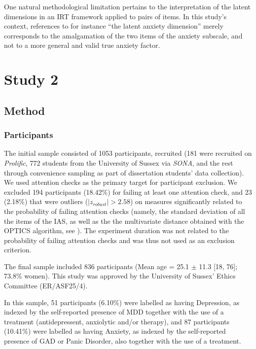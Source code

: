 \documentclass[
  jou,
  floatsintext,
  longtable,
  nolmodern,
  notxfonts,
  notimes,
  colorlinks=true,linkcolor=blue,citecolor=blue,urlcolor=blue]{apa7}
\begin{document}
One natural methodological limitation pertains to the interpretation of
the latent dimensions in an IRT framework applied to pairs of items. In
this study's context, references to for instance ``the latent anxiety
dimension'' merely corresponds to the amalgamation of the two items of
the anxiety subscale, and not to a more general and valid true anxiety
factor.

\section{Study 2}\label{study-2}

\subsection{Method}\label{method-1}

\subsubsection{Participants}\label{participants-1}

The initial sample consisted of 1053 participants, recruited (181 were
recruited on \emph{Prolific}, 772 students from the University of Sussex
via \emph{SONA}, and the rest through convenience sampling as part of
dissertation students' data collection). We used attention checks as the
primary target for participant exclusion. We excluded 194 participants
(18.42\%) for failing at least one attention check, and 23 (2.18\%) that
were outliers (\(|z_{robust}| > 2.58\)) on measures significantly
related to the probability of failing attention checks (namely, the
standard deviation of all the items of the IAS, as well as the the
multivariate distance obtained with the OPTICS algorithm, see
). The
experiment duration was not related to the probability of failing
attention checks and was thus not used as an exclusion criterion.

The final sample included 836 participants (Mean age = 25.1 \(\pm\) 11.3
{[}18, 76{]}; 73.8\% women). This study was approved by the University
of Sussex' Ethics Committee (ER/ASF25/4).

In this sample, 51 participants (6.10\%) were labelled as having
Depression, as indexed by the self-reported presence of MDD together
with the use of a treatment (antidepressent, anxiolytic and/or therapy),
and 87 participants (10.41\%) were labelled as having Anxiety, as
indexed by the self-reported presence of GAD or Panic Disorder, also
together with the use of a treatment.
\end{document}
